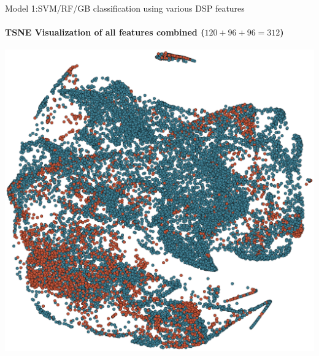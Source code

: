 \documentclass{beamer}
\begin{document}
\begin{frame}{Model 1:SVM/RF/GB classification using various DSP features}
  \framesubtitle{TSNE Visualization of all features combined ($120+96+96 = 312$)}

  \begin{center}
    \vspace*{-0.15cm}
  \includegraphics[scale=0.35]{img/trad_feat_viz.eps}
  \end{center}

\end{frame}
\end{document}
